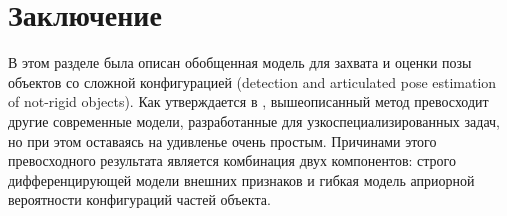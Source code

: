 \section*{Заключение}

В этом разделе была описан обобщенная модель для захвата и оценки позы объектов со сложной конфигурацией (detection and articulated pose estimation of not-rigid objects). Как утверждается в \cite{andriluka09}, вышеописанный метод превосходит другие современные модели, разработанные для узкоспециализированных задач, но при этом оставаясь на удивленье очень простым. Причинами этого превосходного результата является комбинация двух компонентов: строго дифференцирующей модели внешних признаков и гибкая модель априорной вероятности конфигураций частей объекта.

\newpage

